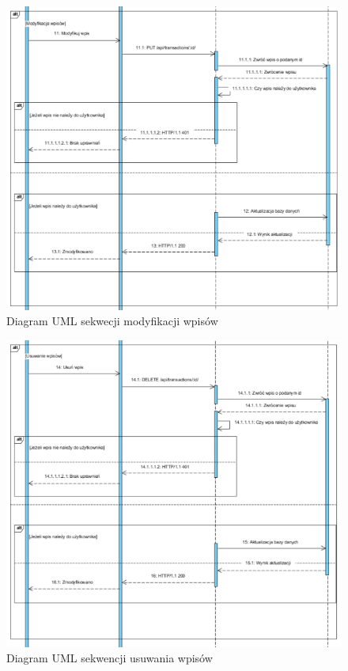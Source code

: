 \documentclass{article}
\begin{document}
	\begin{figure}[H]
		\hspace*{-1.5cm} 
		\includegraphics[scale=0.9]{assets/sq6.png}
		\caption[]{Diagram UML sekwecji modyfikacji wpisów}
		\label{fig:umlmod}
	\end{figure}  
	\begin{figure}[H]
		
		\hspace*{-1.5cm} 
		\includegraphics[scale=0.9]{assets/sq7.png}
		\caption[]{Diagram UML sekwencji usuwania wpisów}
		\label{fig:umlusu}
	\end{figure} 
\end{document}
